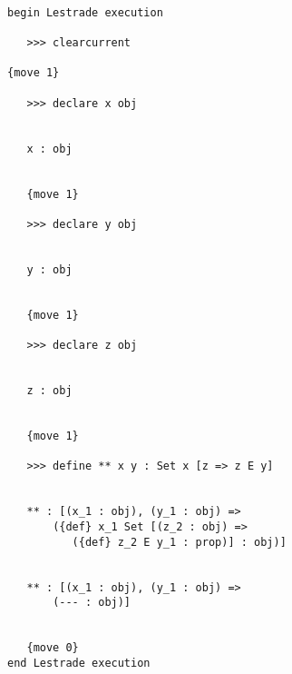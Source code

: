 \documentclass[12pt]{article}
\begin{document}
\begin{verbatim}

begin Lestrade execution

   >>> clearcurrent

{move 1}

   >>> declare x obj


   x : obj


   {move 1}

   >>> declare y obj


   y : obj


   {move 1}

   >>> declare z obj


   z : obj


   {move 1}

   >>> define ** x y : Set x [z => z E y]


   ** : [(x_1 : obj), (y_1 : obj) => 
       ({def} x_1 Set [(z_2 : obj) => 
          ({def} z_2 E y_1 : prop)] : obj)]


   ** : [(x_1 : obj), (y_1 : obj) => 
       (--- : obj)]


   {move 0}
end Lestrade execution
\end{verbatim}
\end{document}
